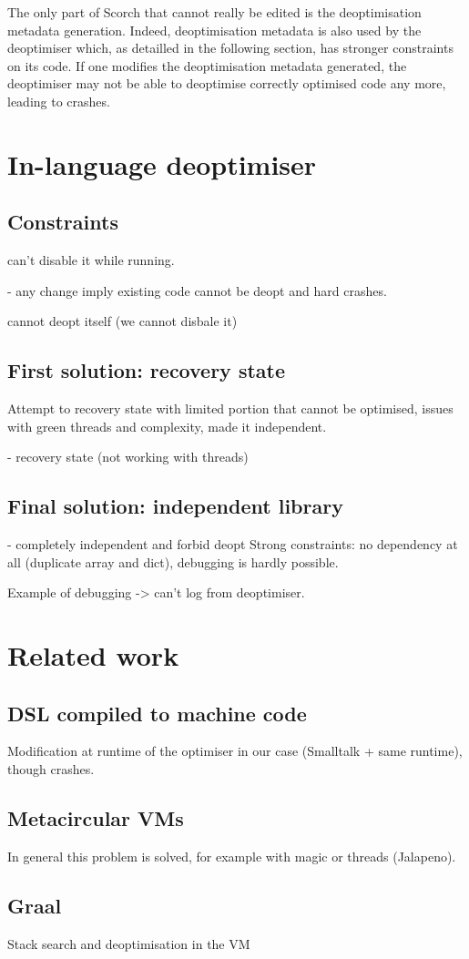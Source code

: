 \documentclass[a4paper,12pt,twoside]{../includes/ThesisStyle}
\begin{document}
The only part of Scorch that cannot really be edited is the deoptimisation metadata generation. Indeed, deoptimisation metadata is also used by the deoptimiser which, as detailled in the following section, has stronger constraints on its code. If one modifies the deoptimisation metadata generated, the deoptimiser may not be able to deoptimise correctly optimised code any more, leading to crashes.

\section{In-language deoptimiser}

\subsection{Constraints}
can't disable it while running. 

- any change imply existing code cannot be deopt and hard crashes.

cannot deopt itself (we cannot disbale it)

\subsection{First solution: recovery state}
 Attempt to recovery state with limited portion that cannot be optimised, issues with green threads and complexity, made it independent.

- recovery state (not working with threads)

\subsection{Final solution: independent library}

- completely independent and forbid deopt
Strong constraints: no dependency at all (duplicate array and dict), debugging is hardly possible.


Example of debugging -> can't log from deoptimiser. 

\section{Related work}

\subsection{DSL compiled to machine code}

Modification at runtime of the optimiser in our case (Smalltalk + same runtime), though crashes.

\subsection{Metacircular VMs}

In general this problem is solved, for example with magic or threads (Jalapeno).

\subsection{Graal}

Stack search and deoptimisation in the VM

\ifx\wholebook\relax\else
    
\end{document}
